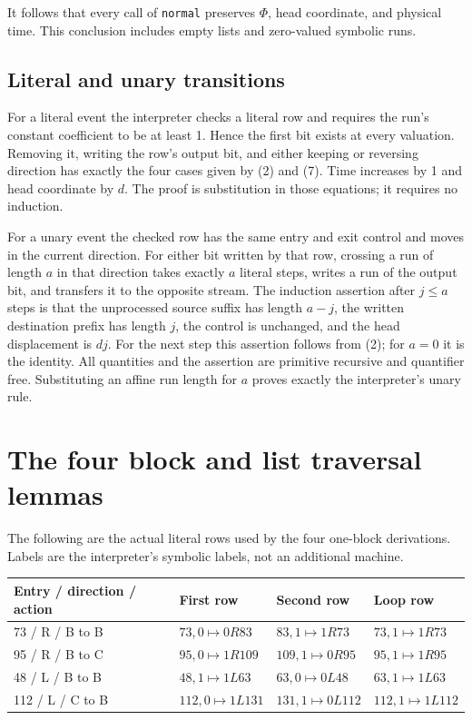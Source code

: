 \documentclass[11pt]{article}
\begin{document}
It follows that every call of \texttt{normal} preserves $\Phi$, head
coordinate, and physical time.  This conclusion includes empty lists and
zero-valued symbolic runs.

\subsection{Literal and unary transitions}

For a literal event the interpreter checks a literal row and requires
the run's constant coefficient to be at least 1.  Hence the first bit
exists at every valuation.  Removing it, writing the row's output bit,
and either keeping or reversing direction has exactly the four cases
given by (2) and (7).  Time increases by 1 and head coordinate by $d$.
The proof is substitution in those equations; it requires no induction.

For a unary event the checked row has the same entry and exit control
and moves in the current direction.  For either bit written by that row,
crossing a run of length $a$ in that direction takes exactly $a$ literal
steps, writes a run of the output bit, and transfers it to the opposite
stream.  The induction assertion after $j\leq a$ steps is that the
unprocessed source suffix has length $a-j$, the written destination
prefix has length $j$, the control is unchanged, and the head displacement
is $dj$.  For the next step this assertion follows from (2); for $a=0$
it is the identity.  All quantities and the assertion are primitive
recursive and quantifier free.  Substituting an affine run length for
$a$ proves exactly the interpreter's unary rule.

\section{The four block and list traversal lemmas}

The following are the actual literal rows used by the four one-block
derivations.  Labels are the interpreter's symbolic labels, not an
additional machine.

\begin{center}
\begin{tabular}{llll}
\toprule
Entry / direction / action & First row & Second row & Loop row\\
\midrule
73 / R / B to B & $73,0\mapsto0R83$ & $83,1\mapsto1R73$
 & $73,1\mapsto1R73$\\
95 / R / B to C & $95,0\mapsto1R109$ & $109,1\mapsto0R95$
 & $95,1\mapsto1R95$\\
48 / L / B to B & $48,1\mapsto1L63$ & $63,0\mapsto0L48$
 & $63,1\mapsto1L63$\\
112 / L / C to B & $112,0\mapsto1L131$ & $131,1\mapsto0L112$
 & $112,1\mapsto1L112$\\
\bottomrule
\end{tabular}
\end{center}
\end{document}
